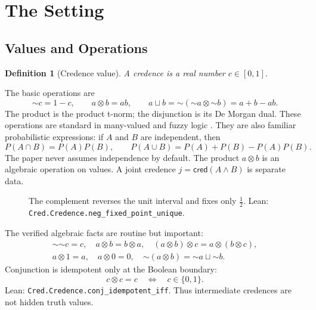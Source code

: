 \documentclass[11pt,a4paper]{article}
\newtheorem{definition}[theorem]{Definition}
\newcommand{\cred}{\mathsf{cred}}
\newcommand{\negc}{\mathord{\sim}}
\newcommand{\conjc}{\otimes}
\newcommand{\disjc}{\sqcup}
\newcommand{\half}{\tfrac12}
\newcommand{\Lean}[1]{\texttt{#1}}
\begin{document}
\section{The Setting}

\subsection{Values and Operations}

\begin{definition}[Credence value]
A credence is a real number $c\in[0,1]$.
\end{definition}

The basic operations are
\[
  \negc c=1-c,\qquad
  a\conjc b=ab,\qquad
  a\disjc b=\negc(\negc a\conjc\negc b)=a+b-ab.
\]
The product is the product t-norm; the disjunction is its De Morgan
dual.  These operations are standard in many-valued and fuzzy logic
\cite{zadeh1965,goguen1969,hajek1998,klement2000,cintula2011}.
They are also familiar probabilistic expressions: if $A$ and $B$ are
independent, then
\[
  P(A\cap B)=P(A)P(B),\qquad
  P(A\cup B)=P(A)+P(B)-P(A)P(B).
\]
The paper never assumes independence by default.  The product
$a\conjc b$ is an algebraic operation on values.  A joint credence
$j=\cred(A\land B)$ is separate data.

\begin{figure}[h]
\centering
{}
\caption{The complement reverses the unit interval and fixes only
$\half$.  Lean: \Lean{Cred.Credence.neg\_fixed\_point\_unique}.}
\label{fig:unit-interval}
\end{figure}

The verified algebraic facts are routine but important:
\[
\begin{gathered}
\negc\negc c=c,\quad
a\conjc b=b\conjc a,\quad
(a\conjc b)\conjc c=a\conjc(b\conjc c),\\
a\conjc 1=a,\quad a\conjc 0=0,\quad
\negc(a\conjc b)=\negc a\disjc\negc b.
\end{gathered}
\]
Conjunction is idempotent only at the Boolean boundary:
\[
  c\conjc c=c \quad\Longleftrightarrow\quad c\in\{0,1\}.
\]
Lean: \Lean{Cred.Credence.conj\_idempotent\_iff}.  Thus intermediate
credences are not hidden truth values.
\end{document}
